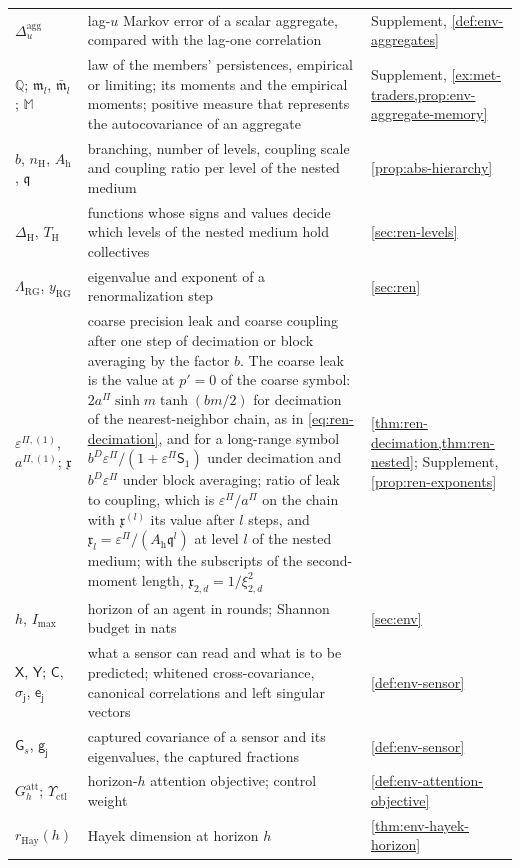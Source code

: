 \begin{longtable}{@{}>{\raggedright\arraybackslash}p{}>{\raggedright\arraybackslash}p{}>{\raggedright\arraybackslash}p{}@{}}
$\Delta^{\mathrm{agg}}_u$ & lag-$u$ Markov error of a scalar aggregate, compared with the lag-one correlation & Supplement, \cref{def:env-aggregates}\\
$\mathbb Q$; $\mathfrak m_l$, $\bar{\mathfrak m}_l$; $\mathbb M$ & law of the members' persistences, empirical or limiting; its moments and the empirical moments; positive measure that represents the autocovariance of an aggregate & Supplement, \cref{ex:met-traders,prop:env-aggregate-memory}\\
$b$, $n_{\mathrm H}$, $A_{\mathrm h}$, $\mathfrak q$ & branching, number of levels, coupling scale and coupling ratio per level of the nested medium & \cref{prop:abs-hierarchy}\\
$\Delta_{\mathrm H}$, $T_{\mathrm H}$ & functions whose signs and values decide which levels of the nested medium hold collectives & \cref{sec:ren-levels}\\
$\Lambda_{\mathrm{RG}}$, $y_{\mathrm{RG}}$ & eigenvalue and exponent of a renormalization step & \cref{sec:ren}\\
$\varepsilon^{\Pi,(1)}$, $a^{\Pi,(1)}$; $\mathfrak x$ & coarse precision leak and coarse coupling after one step of decimation or block averaging by the factor $b$. The coarse leak is the value at $p'=0$ of the coarse symbol: $2a^\Pi\sinh m\tanh(bm/2)$ for decimation of the nearest-neighbor chain, as in \eqref{eq:ren-decimation}, and for a long-range symbol $b^D\varepsilon^\Pi/(1+\varepsilon^\Pi\mathsf S_1)$ under decimation and $b^D\varepsilon^\Pi$ under block averaging; ratio of leak to coupling, which is $\varepsilon^\Pi/a^\Pi$ on the chain with $\mathfrak x^{(l)}$ its value after $l$ steps, and $\mathfrak x_l=\varepsilon^\Pi/(A_{\mathrm h}\mathfrak q^l)$ at level $l$ of the nested medium; with the subscripts of the second-moment length, $\mathfrak x_{2,d}=1/\xi_{2,d}^2$ & \cref{thm:ren-decimation,thm:ren-nested}; Supplement, \cref{prop:ren-exponents}\\
$h$, $I_{\max}$ & horizon of an agent in rounds; Shannon budget in nats & \cref{sec:env}\\
$\mathsf X$, $\mathsf Y$; $\mathsf C$, $\sigma_{\mathsf j}$, $\mathsf e_{\mathsf j}$ & what a sensor can read and what is to be predicted; whitened cross-covariance, canonical correlations and left singular vectors & \cref{def:env-sensor}\\
$\mathsf G_s$, $\mathsf g_{\mathsf j}$ & captured covariance of a sensor and its eigenvalues, the captured fractions & \cref{def:env-sensor}\\
$G^{\mathrm{att}}_h$; $\Upsilon_{\mathrm{ctl}}$ & horizon-$h$ attention objective; control weight & \cref{def:env-attention-objective}\\
$r_{\mathrm{Hay}}(h)$ & Hayek dimension at horizon $h$ & \cref{thm:env-hayek-horizon}\\
\end{longtable}
\endgroup

